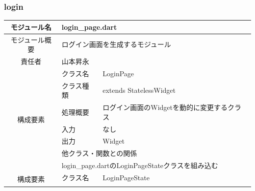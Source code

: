 \subsubsection{login}
\begin{table}[H]
  \centering
  \begin{tabular}{|c|l|l|} \hline
    モジュール名                & \multicolumn{2}{l|}{login\_page.dart}                                                                                            \\ \hline
    モジュール概要               & \multicolumn{2}{p{12cm}|}{ログイン画面を生成するモジュール}                                                                                      \\ \hline
    責任者                   & \multicolumn{2}{l|}{山本昇永}                                                                                                        \\ \hline
    \multirow{7}{*}{構成要素} & クラス名                                                               & LoginPage                                                   \\ \cline{2-3}
                          & クラス種類                                                              & extends StatelessWidget                                     \\ \cline{2-3}
                          & 処理概要                                                               & \multicolumn{1}{p{12cm}|}{ログイン画面のWidgetを動的に変更するクラス}         \\ \cline{2-3}
                          & 入力                                                                 & なし                                                          \\ \cline{2-3}
                          & 出力                                                                 & Widget                                                      \\ \cline{2-3}
                          & \multicolumn{2}{l|}{他クラス・関数との関係}                                                                                                 \\ \cline{2-3}
                          & \multicolumn{2}{p{14cm}|}{login\_page.dartのLoginPageStateクラスを組み込む}                                                               \\ \hline
    \multirow{7}{*}{構成要素} & クラス名                                                               & LoginPageState                                              \\ \cline{2-3}

\end{tabular}
\end{table}
